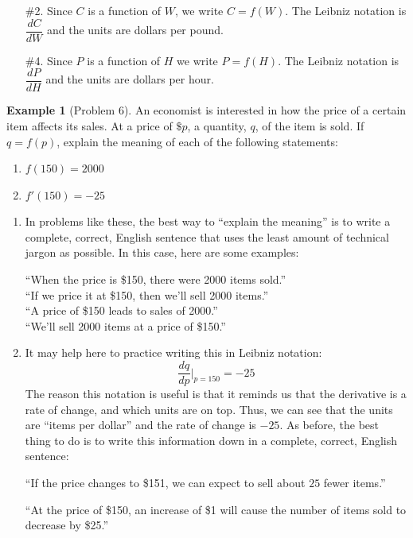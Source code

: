 \documentclass[oneside]{book}
\newcommand{\deriv}[2]{\frac{d#1}{d#2}}
\newcommand{\eval}{\Big|}
\theoremstyle{definition}
\newtheorem{example}{Example}
\theoremstyle{solution}
\newtheorem*{solution}{Solution}
\newenvironment{solution}{\vspace{2in}\comment}{\endcomment}
\begin{document}
\begin{solution}
\begin{enumerate}
\item[\#2.]  Since $C$ is a function of $W$, we write $C = f(W)$.  The
  Leibniz notation is $\dfrac{dC}{dW}$ and the units are dollars per
  pound.  

\item[\#4.]  Since $P$ is a function of $H$ we write $P = f(H)$.  The
  Leibniz notation is $\dfrac{dP}{dH}$ and the units are dollars per
  hour.  
\end{enumerate}
\end{solution}

\begin{example}[Problem 6]
  An economist is interested in how the price of a certain item
  affects its sales.  At a price of $\$p$, a quantity, $q$, of the item
  is sold.  If $q = f(p)$, explain the meaning of each of the following
  statements:
  \begin{enumerate}
  \item $f(150) = 2000$
  \item $f'(150) = -25$
  \end{enumerate}
\end{example}

\begin{solution}
\begin{enumerate}
\item In problems like these, the best way to ``explain the meaning''
  is to write a complete, correct, English sentence that uses the
  least amount of technical jargon as possible.  In this case, here
  are some examples:
\begin{center}
``When the price is \$150, there were 2000 items sold.''\\
``If we price it at \$150, then we'll sell 2000 items.''\\
``A price of \$150 leads to sales of 2000.''\\
``We'll sell 2000 items at a price of \$150.''
\end{center}

\item It may help here to practice writing this in Leibniz notation:
$$
\deriv{q}{p}\eval_{p=150}=-25
$$
The reason this notation is useful is that it reminds us that the
derivative is a rate of change, and which units are on top.  Thus,
we can see that the units are ``items per dollar'' and the rate of
change is $-25$.  As before, the best thing to do is to write this
information down in a complete, correct, English sentence:
\begin{center}
\begin{minipage}{3in}
``If the price changes to \$151, we can expect to sell about $25$
fewer items.''
\bigskip

``At the price of \$150, an increase of \$1 will cause the number of
items sold to decrease by \$25.''
\end{minipage}
\end{center}
\end{enumerate}
\end{solution}
\end{document}
